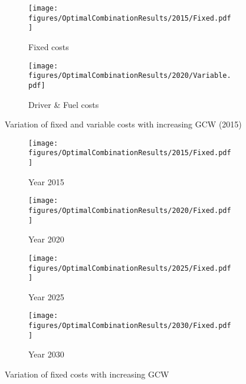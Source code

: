 \documentclass[ExampleMasters.tex]{subfiles}
\begin{document}
\begin{figure}[ht!]
\begin{subfigure}{.5\textwidth}
\centering
\texttt{[image: figures/OptimalCombinationResults/2015/Fixed.pdf]}
\caption{Fixed costs}
\end{subfigure}
\begin{subfigure}{.5\textwidth}
\centering
\texttt{[image: figures/OptimalCombinationResults/2020/Variable.pdf]}
\caption{Driver \& Fuel costs}
\end{subfigure}
\caption{Variation of fixed and variable costs with increasing GCW (2015)}
\label{fixedVariableCostVaryGCW2015}
\end{figure}

\newpage


\begin{figure}[ht!]
\begin{subfigure}{.5\textwidth}
\centering
\texttt{[image: figures/OptimalCombinationResults/2015/Fixed.pdf]}
\caption{Year 2015}
\end{subfigure}
\begin{subfigure}{.5\textwidth}
\centering
\texttt{[image: figures/OptimalCombinationResults/2020/Fixed.pdf]}
\caption{Year 2020}
\end{subfigure}
\begin{subfigure}{.5\textwidth}
\centering
\texttt{[image: figures/OptimalCombinationResults/2025/Fixed.pdf]}
\caption{Year 2025}
\end{subfigure}
\begin{subfigure}{.5\textwidth}
\centering
\texttt{[image: figures/OptimalCombinationResults/2030/Fixed.pdf]}
\caption{Year 2030}
\end{subfigure}
\caption{Variation of fixed costs with increasing GCW}
\label{fixedCostVsGCWOverYears}
\end{figure}

\newpage
\end{document}
